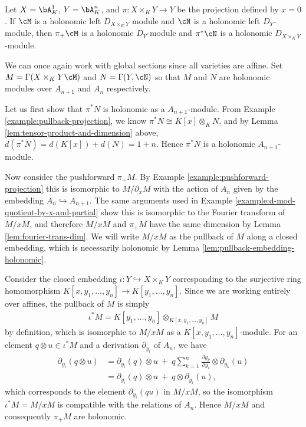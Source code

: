 \begin{thm}\label{thm:pushforwards-pullbacks-holonomy}
	Let $X = \bA^1_K$, $Y = \bA^n_K$, and $\pi:X\times_K Y\to Y$ be the projection defined by $x = 0$. If $\cM$ is a holonomic left $D_{X\times_K Y}$ module and $\cN$ is a holonomic left $D_Y$-module, then $\pi_+\cM$ is a holonomic $D_Y$-module and $\pi^*\cN$ is a holonomic $D_{X\times_K Y}$-module.
\end{thm}
\begin{prf}
	We can once again work with global sections since all varieties are affine. Set $M = \Gamma(X\times_K Y\cM)$ and $N = \Gamma(Y,\cN)$ so that $M$ and $N$ are holonomic modules over $A_{n+1}$ and $A_n$ respectively.

	Let us first show that $\pi^*N$ is holonomic as a $A_{n+1}$-module. From Example \ref{example:pullback-projection}, we know $\pi^*N \cong K[x]\otimes_K N$, and by Lemma \ref{lem:tensor-product-and-dimension} above, $d(\pi^*N) = d(K[x]) + d(N) = 1 + n$. Hence $\pi^*N$ is a holonomic $A_{n+1}$-module.

	Now consider the pushforward $\pi_+M$. By Example \ref{example:pushforward-projection} this is isomorphic to $M/\partial_xM$ with the action of $A_n$ given by the embedding $A_n \hookrightarrow A_{n+1}$. The same arguments used in Example \ref{example:d-mod-quotient-by-x-and-partial} show this is isomorphic to the Fourier transform of $M/xM$, and therefore $M/xM$ and $\pi_+M$ have the same dimension by Lemma \ref{lem:fourier-trans-dim}. We will write $M/xM$ as the pullback of $M$ along a closed embedding, which is necessarily holonomic by Lemma \ref{lem:pullback-embedding-holonomic}.

	Consider the closed embedding $\iota:Y\hookrightarrow X\times_K Y$ corresponding to the surjective ring homomorphism $K[x,y_1,...,y_n] \to K[y_1,...,y_n]$. Since we are working entirely over affines, the pullback of $M$ is simply 
	\begin{align*}
		\iota^*M = K[y_1,...,y_n]\otimes_{K[x,y_1,...,y_n]} M
	\end{align*}
	by definition, which is isomorphic to $M/xM$ as a $K[x,y_1,...,y_n]$-module. For an element $q\otimes u \in \iota^*M$ and a derivation $\partial_{y_i}$ of $A_n$, we have
	\begin{align*}
		\partial_{y_i}(q\otimes u)
		  &= \partial_{y_i}(q)\otimes u ~+~ q\sum_{k=1}^{n} \frac{\partial y_k}{\partial y_i} \otimes \partial_{y_k}(u) \\
		  &= \partial_{y_i}(q)\otimes u ~+~ q\otimes \partial_{y_i}(u),
	\end{align*}
	which corresponds to the element $\partial_{y_i}(qu)$ in $M/xM$, so the isomorphism $\iota^*M = M/xM$ is compatible with the relations of $A_n$. Hence $M/xM$ and consequently $\pi_+M$ are holonomic.
\end{prf}

\newpage
\printbibliography

